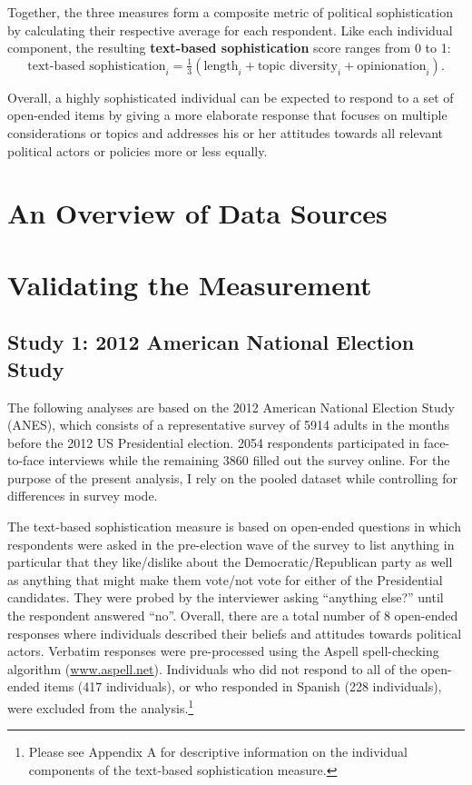 \documentclass[12pt]{article}
\begin{document}
Together, the three measures form a composite metric of political sophistication by calculating their respective average for each respondent. Like each individual component, the resulting \textbf{text-based sophistication} score ranges from 0 to 1:
\begin{equation}
\text{text-based sophistication}_i = \tfrac{1}{3}(\text{length}_i + \text{topic diversity}_i + \text{opinionation}_i).
\end{equation}

Overall, a highly sophisticated individual can be expected to respond to a set of open-ended items by giving a more elaborate response that focuses on multiple considerations or topics and addresses his or her attitudes towards all relevant political actors or policies more or less equally.





\section*{An Overview of Data Sources}


\section*{Validating the Measurement}

\subsection*{Study 1: 2012 American National Election Study}

The following analyses are based on the 2012 American National Election Study (ANES), which consists of a representative survey of 5914 adults in the months before the 2012 US Presidential election. 2054 respondents participated in face-to-face interviews while the remaining 3860 filled out the survey online. For the purpose of the present analysis, I rely on the pooled dataset while controlling for differences in survey mode. 

The text-based sophistication measure is based on open-ended questions in which respondents were asked in the pre-election wave of the survey to list anything in particular that they like/dislike about the Democratic/Republican party as well as anything that might make them vote/not vote for either of the Presidential candidates. They were probed by the interviewer asking ``anything else?'' until the respondent answered ``no''. Overall, there are a total number of 8 open-ended responses where individuals described their beliefs and attitudes towards political actors. Verbatim responses were pre-processed using the Aspell spell-checking algorithm (\url{www.aspell.net}). Individuals who did not respond to all of the open-ended items (417 individuals), or who responded in Spanish (228 individuals), were excluded from the analysis.\footnote{Please see Appendix A for descriptive information on the individual components of the text-based sophistication measure.}
\end{document}
